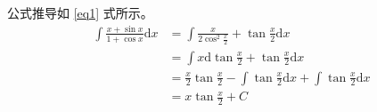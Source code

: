    公式推导如 \eqref{eq1} 式所示。
    \begin{equation}
        \begin{aligned}
            \int \frac{x+\sin x}{1 + \cos x} \mathrm{d} x &= \int \frac{x}{2\cos^2 \frac{x}{2}} + \tan \frac{x}{2} \mathrm{d} x \\
                &= \int x\mathrm{d}\tan \frac{x}{2} + \tan \frac{x}{2} \mathrm{d} x \\
                &= \frac{x}{2}\tan \frac{x}{2} - \int \tan \frac{x}{2} \mathrm{d} x + \int \tan \frac{x}{2} \mathrm{d} x \\
                &= x\tan \frac{x}{2} + C 
        \end{aligned}
        \label{eq1}
    \end{equation}
    
